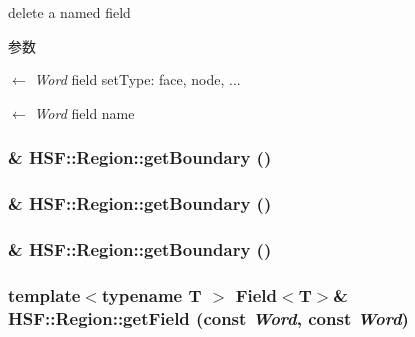 delete a named field 
\begin{DoxyParams}{参数}
\item[\mbox{$\leftarrow$} {\em Word}]field setType: face, node, ... \item[\mbox{$\leftarrow$} {\em Word}]field name \end{DoxyParams}
\hypertarget{classHSF_1_1Region_aa887ee45c20b3b65acc17693d8cb4c45}{
\subsubsection[{getBoundary}]{\& HSF::Region::getBoundary ()}}
\label{classHSF_1_1Region_aa887ee45c20b3b65acc17693d8cb4c45}
\hypertarget{classHSF_1_1Region_aa887ee45c20b3b65acc17693d8cb4c45}{
\subsubsection[{getBoundary}]{\& HSF::Region::getBoundary ()}}
\label{classHSF_1_1Region_aa887ee45c20b3b65acc17693d8cb4c45}
\hypertarget{classHSF_1_1Region_aa887ee45c20b3b65acc17693d8cb4c45}{
\subsubsection[{getBoundary}]{\& HSF::Region::getBoundary ()}}
\label{classHSF_1_1Region_aa887ee45c20b3b65acc17693d8cb4c45}
\hypertarget{classHSF_1_1Region_a2fc8f3916190395f4b43547755113c8e}{
\subsubsection[{getField}]{\setlength{\rightskip}{0pt plus 5cm}template$<$typename T $>$ {\bf Field}$<$T$>$\& HSF::Region::getField (const  {\em Word}, \/  const  {\em Word})}}
\label{classHSF_1_1Region_a2fc8f3916190395f4b43547755113c8e}


